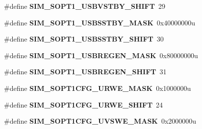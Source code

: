 \begin{DoxyCompactItemize}
\item 
\hypertarget{group___s_i_m___register___masks_gae945165e21faf14e58288bce0918482a}{}\#define {\bfseries S\+I\+M\+\_\+\+S\+O\+P\+T1\+\_\+\+U\+S\+B\+V\+S\+T\+B\+Y\+\_\+\+S\+H\+I\+F\+T}~29\label{group___s_i_m___register___masks_gae945165e21faf14e58288bce0918482a}

\item 
\hypertarget{group___s_i_m___register___masks_ga93a808f7a1d75e26bc3ed565ab257617}{}\#define {\bfseries S\+I\+M\+\_\+\+S\+O\+P\+T1\+\_\+\+U\+S\+B\+S\+S\+T\+B\+Y\+\_\+\+M\+A\+S\+K}~0x40000000u\label{group___s_i_m___register___masks_ga93a808f7a1d75e26bc3ed565ab257617}

\item 
\hypertarget{group___s_i_m___register___masks_ga8a24334d1be5bd01017bd364dd53f268}{}\#define {\bfseries S\+I\+M\+\_\+\+S\+O\+P\+T1\+\_\+\+U\+S\+B\+S\+S\+T\+B\+Y\+\_\+\+S\+H\+I\+F\+T}~30\label{group___s_i_m___register___masks_ga8a24334d1be5bd01017bd364dd53f268}

\item 
\hypertarget{group___s_i_m___register___masks_gac60c367119b3dcc752c4cf857b8a59b5}{}\#define {\bfseries S\+I\+M\+\_\+\+S\+O\+P\+T1\+\_\+\+U\+S\+B\+R\+E\+G\+E\+N\+\_\+\+M\+A\+S\+K}~0x80000000u\label{group___s_i_m___register___masks_gac60c367119b3dcc752c4cf857b8a59b5}

\item 
\hypertarget{group___s_i_m___register___masks_ga99e46c34c02e39338c9b80775bad09db}{}\#define {\bfseries S\+I\+M\+\_\+\+S\+O\+P\+T1\+\_\+\+U\+S\+B\+R\+E\+G\+E\+N\+\_\+\+S\+H\+I\+F\+T}~31\label{group___s_i_m___register___masks_ga99e46c34c02e39338c9b80775bad09db}

\item 
\hypertarget{group___s_i_m___register___masks_gaa4e1ee8f60c8c15ad553c2dfb82c2039}{}\#define {\bfseries S\+I\+M\+\_\+\+S\+O\+P\+T1\+C\+F\+G\+\_\+\+U\+R\+W\+E\+\_\+\+M\+A\+S\+K}~0x1000000u\label{group___s_i_m___register___masks_gaa4e1ee8f60c8c15ad553c2dfb82c2039}

\item 
\hypertarget{group___s_i_m___register___masks_ga07bf2ffc61aacca96748747fa8df7062}{}\#define {\bfseries S\+I\+M\+\_\+\+S\+O\+P\+T1\+C\+F\+G\+\_\+\+U\+R\+W\+E\+\_\+\+S\+H\+I\+F\+T}~24\label{group___s_i_m___register___masks_ga07bf2ffc61aacca96748747fa8df7062}

\item 
\hypertarget{group___s_i_m___register___masks_ga29e593e134a31bed2dbd3673c51cb330}{}\#define {\bfseries S\+I\+M\+\_\+\+S\+O\+P\+T1\+C\+F\+G\+\_\+\+U\+V\+S\+W\+E\+\_\+\+M\+A\+S\+K}~0x2000000u\label{group___s_i_m___register___masks_ga29e593e134a31bed2dbd3673c51cb330}


\end{DoxyCompactItemize}
